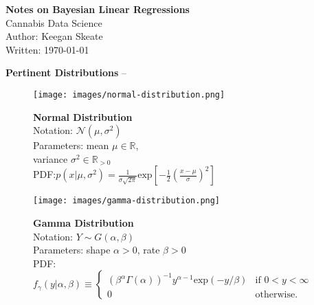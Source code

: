 \documentclass[11pt]{article}
\begin{document}
\noindent\Large {\bfseries\LARGE Notes on Bayesian Linear Regressions}\\Cannabis Data Science\\ Author: Keegan Skeate\\Written: \medskip\today

\vspace{\baselineskip}

{\bfseries Pertinent Distributions} -- 

\begin{minipage}{.45\textwidth}
\begin{figure}
\texttt{[image: images/normal-distribution.png]}
\caption*{%
  \scriptsize
  {\bfseries Normal Distribution}\\[.5\baselineskip]
  Notation: $\mathcal{N}(\mu, \sigma^2)$\\[.5\baselineskip]
  Parameters: mean $\mu \in \mathbb{R}$, \\variance $\sigma^2 \in \mathbb{R}_{>0}$\\[.5\baselineskip]
  PDF:$p(x | \mu, \sigma^2) = \frac{1}{\sigma\sqrt{2\pi}}\text{exp}\left[ -\frac{1}{2}\left( \frac{x - \mu}{\sigma} \right)^2 \right]
$
}
\end{figure}
\end{minipage}\hspace{.05\textwidth}%
\begin{minipage}{.45\textwidth}
\begin{figure}
\texttt{[image: images/gamma-distribution.png]}
\caption*{%
  \scriptsize
  {\bfseries Gamma Distribution}\\[.5\baselineskip]
  Notation: $Y \sim G(\alpha, \beta)$\\[.5\baselineskip]
  Parameters: shape $\alpha > 0$, rate $\beta > 0$\\[.5\baselineskip]
  PDF:$
  f_\gamma(y | \alpha, \beta ) \equiv   \begin{cases}
    (\beta^\alpha \Gamma(\alpha))^{-1} y^{\alpha - 1}\text{exp}(-y /\beta)& \text{if } 0 < y < \infty \\
    0 & \text{otherwise.}
\end{cases}$
}
\end{figure}
\end{minipage}
\end{document}
